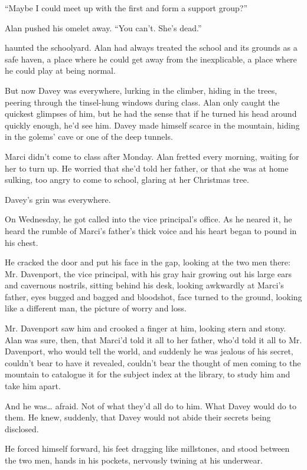 ``Maybe I could meet up with the first and form a support group?''

Alan pushed his omelet away.  ``You can't.  She's dead.''

 haunted the schoolyard.  Alan had always treated the school and
its grounds as a safe haven, a place where he could get away from the
inexplicable, a place where he could play at being normal.

But now Davey was everywhere, lurking in the climber, hiding in the
trees, peering through the tinsel-hung windows during class.  Alan
only caught the quickest glimpses of him, but he had the sense that if
he turned his head around quickly enough, he'd see him.  Davey made
himself scarce in the mountain, hiding in the golems' cave or one of
the deep tunnels.

Marci didn't come to class after Monday.  Alan fretted every morning,
waiting for her to turn up.  He worried that she'd told her father, or
that she was at home sulking, too angry to come to school, glaring at
her Christmas tree.

Davey's grin was everywhere.

On Wednesday, he got called into the vice principal's office.  As he
neared it, he heard the rumble of Marci's father's thick voice and his
heart began to pound in his chest.

He cracked the door and put his face in the gap, looking at the two
men there:  Mr.  Davenport, the vice principal, with his gray hair
growing out his large ears and cavernous nostrils, sitting behind his
desk, looking awkwardly at Marci's father, eyes bugged and bagged and
bloodshot, face turned to the ground, looking like a different man,
the picture of worry and loss.

Mr.  Davenport saw him and crooked a finger at him, looking stern and
stony.  Alan was sure, then, that Marci'd told it all to her father,
who'd told it all to Mr.  Davenport, who would tell the world, and
suddenly he was jealous of his secret, couldn't bear to have it
revealed, couldn't bear the thought of men coming to the mountain to
catalogue it for the subject index at the library, to study him and
take him apart.

And he was\ldots{}  afraid.  Not of what they'd all do to him.  What Davey
would do to them.  He knew, suddenly, that Davey would not abide their
secrets being disclosed.

He forced himself forward, his feet dragging like millstones, and
stood between the two men, hands in his pockets, nervously twining at
his underwear.

